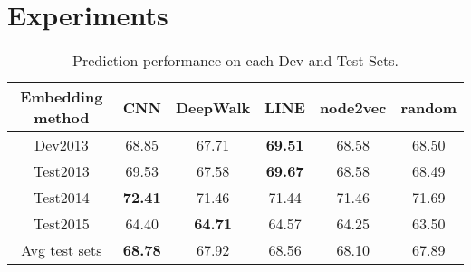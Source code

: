 

\section{Experiments}



\begin{table}[htbp]
\begin{center}
\begin{tabular}{|c|c|c c c c|}
\hline
Embedding method & CNN & DeepWalk & LINE & node2vec & random\\
\hline
Dev2013  & 68.85 & 67.71 & \textbf{69.51} & 68.58 & 68.50 \\
\hline
Test2013  & 69.53 & 67.58 & \textbf{69.67} & 68.58 & 68.49 \\
Test2014  & \textbf{72.41} & 71.46 & 71.44 & 71.46 & 71.69 \\
Test2015  & 64.40 & \textbf{64.71} & 64.57 & 64.25 & 63.50 \\
\hline
Avg test sets & \textbf{68.78}& 67.92 & 68.56  & 68.10 & 67.89 \\
\hline
\end{tabular}
\end{center}
\caption{Prediction performance on each Dev and Test Sets. }
\label{Tb:}
\end{table}%
